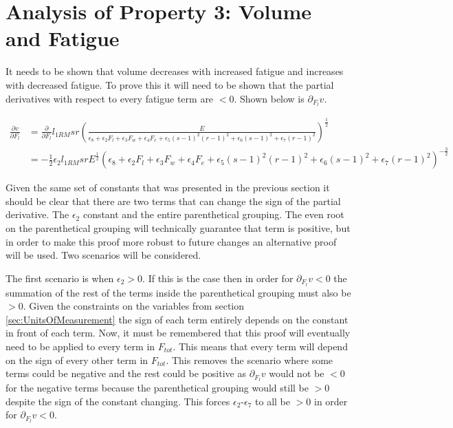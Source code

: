 \section{Analysis of Property 3: Volume and Fatigue}
\label{sec:VolumeBasePotentialSurfaceProperty3}

It needs to be shown that volume decreases with increased fatigue and increases with decreased fatigue. To prove this it will need to be shown that the partial derivatives with respect to every fatigue term are $<0$. Shown below is $\partial_{F_l}v$.

\begin{equation*}
	\begin{split}
		\frac{\partial v}{\partial F_l} & =
		\frac{\partial}{\partial F_l} l_{1RM} sr \left( 
    			\frac{
    				E
    			}{
    				\epsilon_8+
    				\epsilon_2 F_l+
    				\epsilon_3 F_w+
    				\epsilon_4 F_e+
    				\epsilon_5 (s-1)^2(r-1)^2+
    				\epsilon_6 (s-1)^2+
    				\epsilon_7 (r-1)^2
    			}
    		\right)^{\frac{1}{2}}
    		\\
    		& = -\frac{1}{2}
    			\epsilon_2 l_{1RM} sr E^{\frac{1}{2}}
    			\left(
	    			\epsilon_8+
    				\epsilon_2 F_l+
    				\epsilon_3 F_w+
    				\epsilon_4 F_e+
    				\epsilon_5 (s-1)^2(r-1)^2+
    				\epsilon_6 (s-1)^2+
    				\epsilon_7 (r-1)^2
    			\right)^{-\frac{3}{2}}
    	\end{split}
\end{equation*}

Given the same set of constants that was presented in the previous section it should be clear that there are two terms that can change the sign of the partial derivative. The $\epsilon_2$ constant and the entire parenthetical grouping. The even root on the parenthetical grouping will technically guarantee that term is positive, but in order to make this proof more robust to future changes an alternative proof will be used. Two scenarios will be considered.

The first scenario is when $\epsilon_2>0$. If this is the case then in order for $\partial_{F_l}v<0$ the summation of the rest of the terms inside the parenthetical grouping must also be $>0$. Given the constraints on the variables from section \ref{sec:UnitsOfMeasurement} the sign of each term entirely depends on the constant in front of each term. Now, it must be remembered that this proof will eventually need to be applied to every term in $F_{tot}$. This means that every term will depend on the sign of every other term in $F_{tot}$. This removes the scenario where some terms could be negative and the rest could be positive as $\partial_{F_l}v$ would not be $<0$ for the negative terms because the parenthetical grouping would still be $>0$ despite the sign of the constant changing. This forces $\epsilon_2$-$\epsilon_7$ to all be $>0$ in order for $\partial_{F_l}v<0$. 


